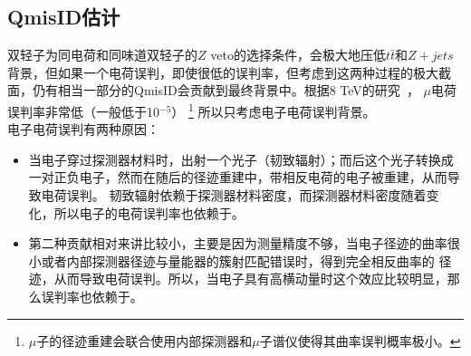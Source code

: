 \subsection{QmisID估计}\label{sec:QmisID_estimation}
双轻子为同电荷和同味道双轻子的$Z$ veto的选择条件，会极大地压低$t\bar{t}$和$Z+jets$背景，但如果一个电荷误判，即使很低的误判率，但考虑到这两种过程的极大截面，仍有相当一部分的QmisID会贡献到最终背景中。根据8 TeV的研究~\cite{MuonQmisIDnote}，
$\mu$电荷误判率非常低（一般低于10$^{-5}$）
\footnote{$\mu$子的径迹重建会联合使用内部探测器和$\mu$子谱仪使得其曲率误判概率极小。}
所以只考虑电子电荷误判背景。\\
电子电荷误判有两种原因：
\begin{itemize}
  \item 当电子穿过探测器材料时，出射一个光子（韧致辐射）；而后这个光子转换成一对正负电子，然而在随后的径迹重建中，带相反电荷的电子被重建，从而导致电荷误判。
韧致辐射依赖于探测器材料密度，而探测器材料密度随着\abseta 变化，所以电子的电荷误判率也依赖于\abseta。 
  \item 第二种贡献相对来讲比较小，主要是因为测量精度不够，当电子径迹的曲率很小或者内部探测器径迹与量能器的簇射匹配错误时，得到完全相反曲率的
径迹，从而导致电荷误判。所以，当电子具有高横动量时这个效应比较明显，那么误判率也依赖于\pt。
\end{itemize}
